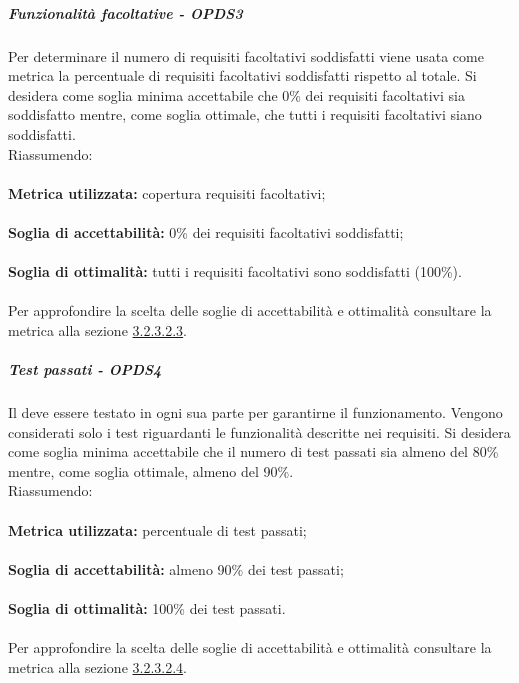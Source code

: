 \documentclass[PianoDiQualifica.tex]{subfiles}
\begin{document}
				
				\subparagraph{Funzionalità facoltative - OPDS3}
				Per determinare il numero di requisiti facoltativi soddisfatti viene usata come metrica la percentuale di requisiti facoltativi soddisfatti rispetto al totale.
				Si desidera come soglia minima accettabile che 0\% dei requisiti facoltativi sia soddisfatto mentre, come soglia ottimale, che tutti i requisiti facoltativi siano soddisfatti. \\
				Riassumendo: \\ \\
				\textbf{Metrica utilizzata:} copertura requisiti facoltativi;\\ \\
				\textbf{Soglia di accettabilità:}  0\% dei requisiti facoltativi soddisfatti; \\ \\
				\textbf{Soglia di ottimalità:} tutti i requisiti facoltativi sono soddisfatti (100\%). \\ \\
				Per approfondire la scelta delle soglie di accettabilità e ottimalità consultare la metrica alla sezione \hyperlink{req_facoltativi}{3.2.3.2.3}.
				
				\subparagraph{Test passati - OPDS4}
				Il  deve essere testato in ogni sua parte per garantirne il funzionamento. Vengono considerati solo i test riguardanti le funzionalità descritte nei requisiti.
				Si desidera come soglia minima accettabile che il numero di test passati sia almeno del 80\% mentre, come soglia ottimale, almeno del 90\%. \\
				Riassumendo: \\ \\
				\textbf{Metrica utilizzata:} percentuale di test passati;\\ \\
				\textbf{Soglia di accettabilità:} almeno 90\% dei test passati; \\ \\
				\textbf{Soglia di ottimalità:} 100\% dei test passati. \\ \\
				Per approfondire la scelta delle soglie di accettabilità e ottimalità consultare la metrica alla sezione \hyperlink{test_passati}{3.2.3.2.4}.
				
\end{document}

